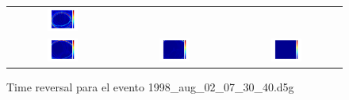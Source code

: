 \begin{figure}[H]
\begin{tabular}{ccc}
	\includegraphics[width=0.3\textwidth]{linea_timerev/figuras/timereversal/ev1/tr135.png}\\
	\includegraphics[width=0.3\textwidth]{linea_timerev/figuras/timereversal/ev1/tr136.png}&
	\includegraphics[width=0.3\textwidth]{linea_timerev/figuras/timereversal/ev1/tr137.png}&
	\includegraphics[width=0.3\textwidth]{linea_timerev/figuras/timereversal/ev1/tr138.png}\\
\end{tabular}
\caption{Time reversal para el evento 1998\_aug\_02\_07\_30\_40.d5g}
\end{figure}

